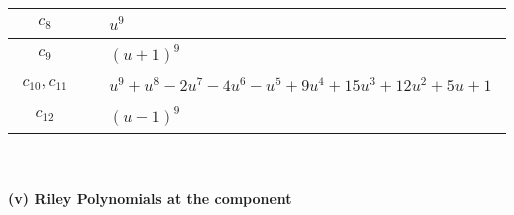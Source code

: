 \documentclass[1p]{elsarticle_modified}
\theoremstyle{definition}
\begin{document}
\begin{tabular}{m{50pt}|m{274pt}}
\hline $$\begin{aligned}c_{8}\end{aligned}$$&$\begin{aligned}
&u^9
\end{aligned}$\\
\hline $$\begin{aligned}c_{9}\end{aligned}$$&$\begin{aligned}
&(u+1)^9
\end{aligned}$\\
\hline $$\begin{aligned}c_{10},c_{11}\end{aligned}$$&$\begin{aligned}
&u^9+u^8-2 u^7-4 u^6- u^5+9 u^4+15 u^3+12 u^2+5 u+1
\end{aligned}$\\
\hline $$\begin{aligned}c_{12}\end{aligned}$$&$\begin{aligned}
&(u-1)^9
\end{aligned}$\\
\hline
\end{tabular}\\~\\
\newpage\renewcommand{\arraystretch}{1}
\flushleft \textbf{(v) Riley Polynomials at the component}\newline \\
\end{document}
